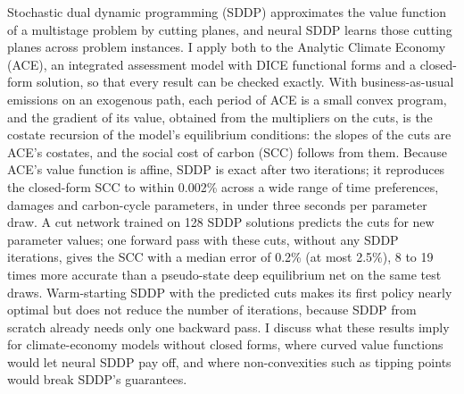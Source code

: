 Stochastic dual dynamic programming (SDDP) approximates the value function of a multistage problem by cutting planes, and neural SDDP learns those cutting planes across problem instances. I apply both to the Analytic Climate Economy (ACE), an integrated assessment model with DICE functional forms and a closed-form solution, so that every result can be checked exactly. With business-as-usual emissions on an exogenous path, each period of ACE is a small convex program, and the gradient of its value, obtained from the multipliers on the cuts, is the costate recursion of the model's equilibrium conditions: the slopes of the cuts are ACE's costates, and the social cost of carbon (SCC) follows from them. Because ACE's value function is affine, SDDP is exact after two iterations; it reproduces the closed-form SCC to within 0.002\% across a wide range of time preferences, damages and carbon-cycle parameters, in under three seconds per parameter draw. A cut network trained on 128 SDDP solutions predicts the cuts for new parameter values; one forward pass with these cuts, without any SDDP iterations, gives the SCC with a median error of 0.2\% (at most 2.5\%), 8 to 19 times more accurate than a pseudo-state deep equilibrium net on the same test draws. Warm-starting SDDP with the predicted cuts makes its first policy nearly optimal but does not reduce the number of iterations, because SDDP from scratch already needs only one backward pass. I discuss what these results imply for climate-economy models without closed forms, where curved value functions would let neural SDDP pay off, and where non-convexities such as tipping points would break SDDP's guarantees.
